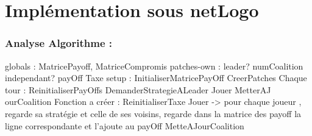 \documentclass[30pt]{report}
\begin{document}
\part{Implémentation sous netLogo}
\section{Analyse Algorithme :}
\vspace{10 mm}
globals : MatricePayoff, MatriceCompromis
\newline
\newline
patches-own :  
\newline
leader? 
\newline
numCoalition
\newline
independant?
\newline
payOff
\newline
Taxe
\newline
\newline
setup : 
\newline
InitialiserMatricePayOff
\newline
CreerPatches
\newline
Chaque tour : 
\newline
ReinitialiserPayOffs
\newline
DemanderStrategieALeader
\newline
Jouer
\newline
MetterAJ
\newline
ourCoalition
\newline
Fonction a créer : ReinitialiserTaxe
\newline
Jouer -> pour chaque joueur , regarde sa stratégie et celle de ses voisins, regarde dans la matrice des payoff la ligne correspondante et l'ajoute au payOff
\newline
MetteAJourCoalition
\end{document}
